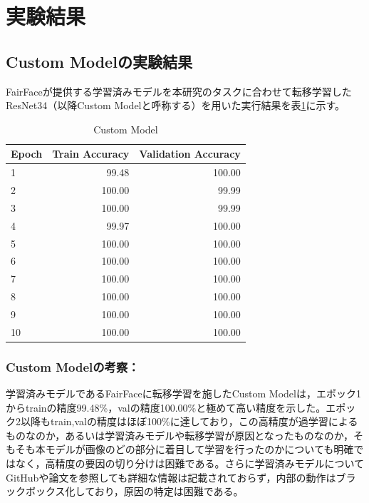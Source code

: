 \documentclass[a4paper,11pt,titlepage]{jsarticle}
\begin{document}
\clearpage
\section{実験結果}
\label{label:実験結果}
\subsection{Custom Modelの実験結果}
FairFaceが提供する学習済みモデルを本研究のタスクに合わせて転移学習したResNet34（以降Custom Modelと呼称する）を用いた実行結果を表\ref{tab:Custom}に示す。

\begin{table}[H]
\centering
\caption{Custom Model}
\label{tab:Custom}
\begin{tabular}{lrr}
\hline
 Epoch &  Train Accuracy &  Validation Accuracy \\
\hline
     1 &           99.48 &               100.00 \\
     2 &          100.00 &                99.99 \\
     3 &          100.00 &                99.99 \\
     4 &           99.97 &               100.00 \\
     5 &          100.00 &               100.00 \\
     6 &          100.00 &               100.00 \\
     7 &          100.00 &               100.00 \\
     8 &          100.00 &               100.00 \\
     9 &          100.00 &               100.00 \\
    10 &          100.00 &               100.00 \\
\hline
\end{tabular}
\end{table}
% 

\subsubsection*{Custom Modelの考察：}
学習済みモデルであるFairFaceに転移学習を施したCustom Modelは，エポック1からtrainの精度99.48\%，valの精度100.00\%と極めて高い精度を示した。エポック2以降もtrain,valの精度はほぼ100\%に達しており，この高精度が過学習によるものなのか，あるいは学習済みモデルや転移学習が原因となったものなのか，そもそも本モデルが画像のどの部分に着目して学習を行ったのかについても明確ではなく，高精度の要因の切り分けは困難である。さらに学習済みモデルについてGitHubや論文を参照しても詳細な情報は記載されておらず，内部の動作はブラックボックス化しており，原因の特定は困難である。\par
\end{document}
